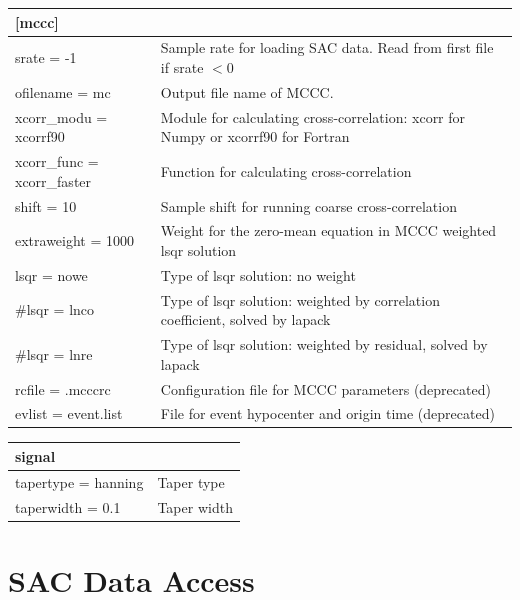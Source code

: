 \documentclass[letterpaper,10pt,english]{sphinxmanual}
\begin{document}
\begin{tabulary}{\linewidth}{|L|L|}
\hline
\textsf{\relax 
{[}mccc{]}
} & \textsf{\relax }\\
\hline
srate = -1
 & 
Sample rate for loading SAC data.
Read from first file if srate \(< 0\)
\\

ofilename = mc
 & 
Output file name of MCCC.
\\

xcorr\_modu = xcorrf90
 & 
Module for calculating cross-correlation:
xcorr for Numpy or xcorrf90 for Fortran
\\

xcorr\_func = xcorr\_faster
 & 
Function for calculating cross-correlation
\\

shift = 10
 & 
Sample shift for running coarse cross-correlation
\\

extraweight = 1000
 & 
Weight for the zero-mean equation in MCCC weighted lsqr solution
\\

lsqr = nowe
 & 
Type of lsqr solution: no weight
\\

\#lsqr = lnco
 & 
Type of lsqr solution: weighted by correlation coefficient,
solved by lapack
\\

\#lsqr = lnre
 & 
Type of lsqr solution: weighted by residual, solved by lapack
\\

rcfile = .mcccrc
 & 
Configuration file for MCCC parameters (deprecated)
\\

evlist = event.list
 & 
File for event hypocenter and origin time (deprecated)
\\
\hline\end{tabulary}


\begin{tabulary}{\linewidth}{|L|L|}
\hline
\textsf{\relax 
signal
} & \textsf{\relax }\\
\hline
tapertype = hanning
 & 
Taper type
\\

taperwidth = 0.1
 & 
Taper width
\\
\hline\end{tabulary}



\chapter{SAC Data Access}
\label{docfiles/SACdataAccess:sac-data-access}\label{docfiles/SACdataAccess::doc}
\end{document}
